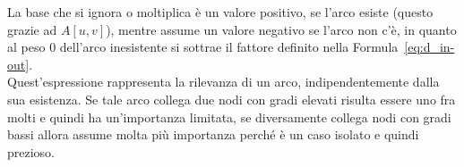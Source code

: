 La base che si ignora o moltiplica è un valore positivo, se l'arco esiste (questo grazie ad $ A \left[ u,v \right]$), mentre assume un valore negativo se l'arco non c'è, in quanto al peso $0$ dell'arco inesistente si sottrae il fattore definito nella Formula~\ref{eq:d_in-out}.\\
Quest'espressione rappresenta la rilevanza di un arco, indipendentemente dalla sua esistenza. Se tale arco collega due nodi con gradi elevati risulta essere uno fra molti e quindi ha un'importanza limitata, se diversamente collega nodi con gradi bassi allora assume molta più importanza perché è un caso isolato e quindi prezioso.
%



